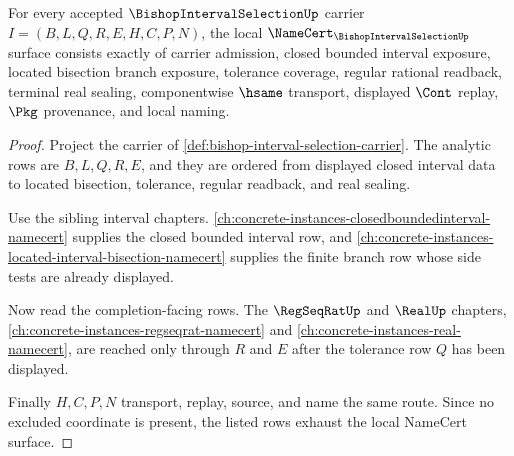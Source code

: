 \begin{theorem}
\label{thm:bishop-interval-selection-namecert-obligations}
For every accepted $\BishopIntervalSelectionUp$ carrier $I=(B,L,Q,R,E,H,C,P,N)$, the local $\NameCert_{\BishopIntervalSelectionUp}$ surface consists exactly of carrier admission, closed bounded interval exposure, located bisection branch exposure, tolerance coverage, regular rational readback, terminal real sealing, componentwise $\hsame$ transport, displayed $\Cont$ replay, $\Pkg$ provenance, and local naming.
\end{theorem}
\begin{proof}
Project the carrier of \autoref{def:bishop-interval-selection-carrier}. The analytic rows are $B,L,Q,R,E$, and they are ordered from displayed closed interval data to located bisection, tolerance, regular readback, and real sealing.

Use the sibling interval chapters. \autoref{ch:concrete-instances-closedboundedinterval-namecert} supplies the closed bounded interval row, and \autoref{ch:concrete-instances-located-interval-bisection-namecert} supplies the finite branch row whose side tests are already displayed.

Now read the completion-facing rows. The $\RegSeqRatUp$ and $\RealUp$ chapters, \autoref{ch:concrete-instances-regseqrat-namecert} and \autoref{ch:concrete-instances-real-namecert}, are reached only through $R$ and $E$ after the tolerance row $Q$ has been displayed.

Finally $H,C,P,N$ transport, replay, source, and name the same route. Since no excluded coordinate is present, the listed rows exhaust the local NameCert surface.
\end{proof}


